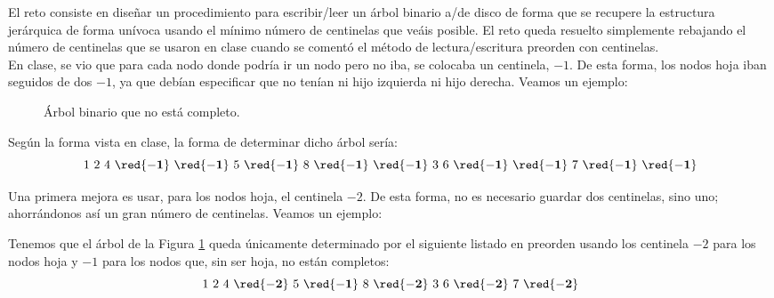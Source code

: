El reto consiste en diseñar un procedimiento para escribir/leer un árbol binario a/de disco de forma que se recupere la estructura jerárquica de forma unívoca usando el mínimo número de centinelas que veáis posible. El reto queda resuelto simplemente rebajando el número de centinelas que se usaron en clase cuando se comentó el método de lectura/escritura preorden con centinelas.\\


    En clase, se vio que para cada nodo donde podría ir un nodo pero no iba, se colocaba un centinela, $-1$. De esta forma, los nodos hoja iban seguidos de dos $-1$, ya que debían especificar que no tenían ni hijo izquierda ni hijo derecha. Veamos un ejemplo:
    \begin{figure}[H]
        \centering
        \caption{Árbol binario que no está completo.}
        \label{fig:arb_1}
    \end{figure}

    Según la forma vista en clase, la forma de determinar dicho árbol sería:
    \begin{equation*}
        1~2~4~\red{\mathbf{-1}}~\red{\mathbf{-1}}~5~\red{\mathbf{-1}}~8~\red{\mathbf{-1}}~\red{\mathbf{-1}}~3~6~\red{\mathbf{-1}}~\red{\mathbf{-1}}~7~\red{\mathbf{-1}}~\red{\mathbf{-1}}
    \end{equation*}
    
    
    
    
    Una primera mejora es usar, para los nodos hoja, el centinela $-2$. De esta forma, no es necesario guardar dos centinelas, sino uno; ahorrándonos así un gran número de centinelas. Veamos un ejemplo:
    

    Tenemos que el árbol de la Figura \ref{fig:arb_1} queda únicamente determinado por el siguiente listado en preorden usando los centinela $-2$ para los nodos hoja y $-1$ para los nodos que, sin ser hoja, no están completos:
    \begin{equation*}
        1~2~4~\red{\mathbf{-2}}~5~\red{\mathbf{-1}}~8~\red{\mathbf{-2}}~3~6~\red{\mathbf{-2}}~7~\red{\mathbf{-2}}
    \end{equation*}

